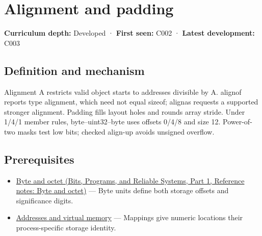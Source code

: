\hypertarget{appendix-a1f7c53b4742}{}\label{referencestart:appendix-a1f7c53b4742}
\section{Alignment and padding}\label{appendix-a1f7c53b4742-alignment-and-padding}

\hypertarget{appendix-a1f7c53b4742-alignment-and-padding}{}

\textbf{Curriculum depth:} Developed · \textbf{First seen:} C002 · \textbf{Latest development:} C003

\begin{allmightroledefinition}

\subsection{Definition and mechanism}\label{appendix-a1f7c53b4742-definition-and-mechanism}

\hypertarget{appendix-a1f7c53b4742-definition-and-mechanism}{}

Alignment A restricts valid object starts to addresses divisible by A. alignof reports type alignment, which need not equal sizeof; alignas requests a supported stronger alignment. Padding fills layout holes and rounds array stride. Under 1/4/1 member rules, byte--uint32--byte uses offsets 0/4/8 and size 12. Power-of-two masks test low bits; checked align-up avoids unsigned overflow.

\end{allmightroledefinition}

\subsection{Prerequisites}\label{appendix-a1f7c53b4742-prerequisites}

\hypertarget{appendix-a1f7c53b4742-prerequisites}{}

\begin{itemize}
\tightlist
\item
  \href{../01-Bits-Programs-and-Reliable-Systems-P01/main.pdf\#nameddest=appendix-5bee2df85484}{Byte and octet (Bits, Programs, and Reliable Systems, Part 1, Reference notes: Byte and octet)} --- Byte units define both storage offsets and significance digits.
\item
  \hyperref[appendix-18ee4f913c3c]{Addresses and virtual memory} --- Mappings give numeric locations their process-specific storage identity.
\end{itemize}

